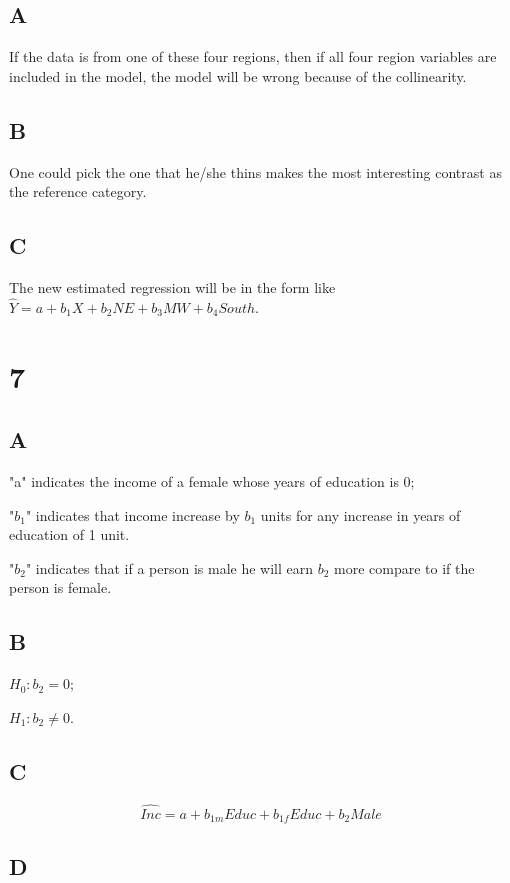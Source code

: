 \documentclass{article}
\begin{document}
\subsection*{A}

If the data is from one of these four regions, then if all four region variables are included in the model, the model will be wrong because of the collinearity.
\subsection*{B}

One could pick the one that he/she thins makes the most interesting contrast as the reference category.

\subsection*{C}

The new estimated regression will be in the form like $\hat{Y}=a+b_1X+b_2NE+b_3MW+b_4South$.

\section*{7}

\subsection*{A}\noindent

"a" indicates the income of a female whose years of education is 0;

"$b_1$" indicates that income increase by $b_1$ units for any increase in years of education of 1 unit.

"$b_2$" indicates that if a person is male he will earn $b_2$ more compare to if the person is female.

\subsection*{B}\noindent

$H_0: b_2=0$;

$H_1: b_2\ne 0$.

\subsection*{C}

\[
\hat{Inc}=a+b_{1m}Educ+b_{1f}Educ+b_2Male
\]

\subsection*{D}
\end{document}
